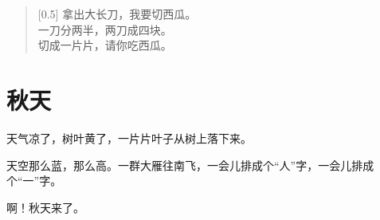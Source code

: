 \documentclass[12pt,UTF-8,openany]{ctexbook}
\begin{document}
\begin{large}
    
    \begin{verse}[0.5\linewidth]
        拿出大长刀，我要切西瓜。 \\
        一刀分两半，两刀成四块。 \\
        切成一片片，请你吃西瓜。
    \end{verse}
    
\end{large}


\clearpage

\begin{center}
    
\end{center}


\hanzibox{}\hanzibox{}\hanzibox{}\hanzibox{}\hspace{1em}\hanzibox{}\hanzibox{}\hanzibox{}\hanzibox{}

\hanzibox{}\hanzibox{}\hanzibox{}\hanzibox{}\hspace{1em}\hanzibox{}\hanzibox{}\hanzibox{}\hanzibox{}

\hanzibox{}\hanzibox{}\hanzibox{}\hanzibox{}\hspace{1em}\hanzibox{}\hanzibox{}\hanzibox{}\hanzibox{}

\hanzibox{}\hanzibox{}\hanzibox{}\hanzibox{}\hspace{1em}




\chapter{秋天}

\begin{large}
    
    天气凉了，树叶黄了，一片片叶子从树上落下来。
    
    天空那么蓝，那么高。一群大雁往南飞，一会儿排成个“人”字，一会儿排成个“一”字。
    
    啊！秋天来了。
    
\end{large}


\clearpage

\begin{center}
    
    
    
\end{center}
\end{document}
